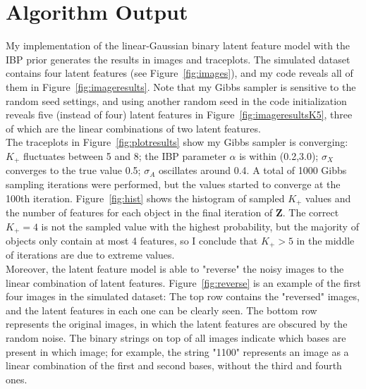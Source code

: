 \section{Algorithm Output}
My implementation of the linear-Gaussian binary latent feature model with the IBP prior generates the results in images and traceplots. The simulated dataset contains four latent features (see Figure~\ref{fig:images}), and my code reveals all of them in Figure~\ref{fig:imageresults}. Note that my Gibbs sampler is sensitive to the random seed settings, and using another random seed in the code initialization reveals five (instead of four) latent features in Figure~\ref{fig:imageresultsK5}, three of which are the linear combinations of two latent features.\\ 

The traceplots in Figure~\ref{fig:plotresults} show my Gibbs sampler is converging: $K_+$ fluctuates between 5 and 8; the IBP parameter $\alpha$ is within (0.2,3.0); $\sigma_X$ converges to the true value 0.5; $\sigma_A$ oscillates around 0.4. A total of 1000 Gibbs sampling iterations were performed, but the values started to converge at the 100th iteration. Figure~\ref{fig:hist} shows the histogram of sampled $K_+$ values and the number of features for each object in the final iteration of $\mathbf{Z}$. The correct $K_+ = 4$ is not the sampled value with the highest probability, but the majority of objects only contain at most 4 features, so I conclude that $K_+ > 5$ in the middle of iterations are due to extreme values. \\

Moreover, the latent feature model is able to "reverse" the noisy images to the linear combination of latent features. Figure~\ref{fig:reverse} is an example of the first four images in the simulated dataset: The top row contains the "reversed" images, and the latent features in each one can be clearly seen. The bottom row represents the original images, in which the latent features are obscured by the random noise. The binary strings on top of all images indicate which bases are present in which image; for example, the string "1100" represents an image as a linear combination of the first and second bases, without the third and fourth ones.

